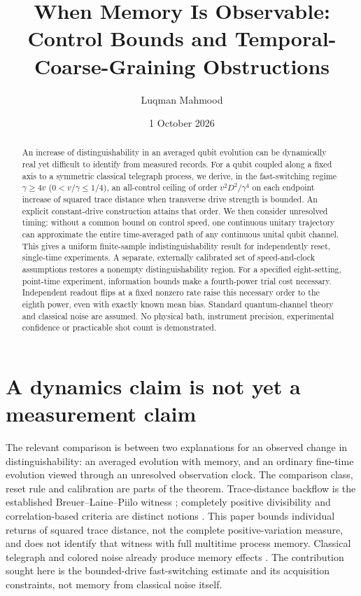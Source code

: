 \documentclass[11pt]{article}
\title{When Memory Is Observable:\\Control Bounds and Temporal-Coarse-Graining Obstructions}
\author{Luqman Mahmood}
\date{1 October 2026}
\begin{document}
\maketitle
{}
\begin{abstract}
An increase of distinguishability in an averaged qubit evolution can be
dynamically real yet difficult to identify from measured records. For a qubit
coupled along a fixed axis to a symmetric classical telegraph process, we
derive, in the fast-switching regime $\gamma\geq4v$ ($0<v/\gamma\leq1/4$),
an all-control ceiling of order $v^2D^2/\gamma^4$ on each endpoint
increase of squared trace distance when transverse drive strength is bounded.
An explicit constant-drive construction attains that order. We then consider
unresolved timing: without a common bound on control speed, one continuous
unitary trajectory can approximate the entire time-averaged path of any
continuous unital qubit channel. This gives a uniform finite-sample
indistinguishability result for independently reset, single-time experiments.
A separate, externally calibrated set of speed-and-clock assumptions restores a
nonempty distinguishability region. For a specified eight-setting,
point-time experiment, information bounds make a fourth-power trial cost
necessary. Independent readout flips at a fixed nonzero rate raise this
necessary order to the eighth power, even with exactly known mean bias.
Standard quantum-channel theory and
classical noise are assumed. No physical bath, instrument precision,
experimental confidence or practicable shot count is demonstrated.
\end{abstract}

\section{A dynamics claim is not yet a measurement claim}
The relevant comparison is between two explanations for an observed
change in distinguishability: an averaged evolution with memory, and an
ordinary fine-time evolution viewed through an unresolved observation clock.
The comparison class, reset rule and calibration are parts of the theorem.
Trace-distance backflow is the established Breuer--Laine--Piilo witness
\cite{BLP}; completely positive divisibility and correlation-based criteria
are distinct notions \cite{RHP,BLPV}. This paper bounds individual returns
of squared trace distance, not the complete positive-variation measure,
and does not identify that witness with full multitime process memory.
Classical telegraph and colored noise already produce memory effects
\cite{Daffer,Benedetti2013,Benedetti2014}. The contribution sought here is
the bounded-drive fast-switching estimate and its acquisition constraints,
not memory from classical noise itself.
\end{document}
